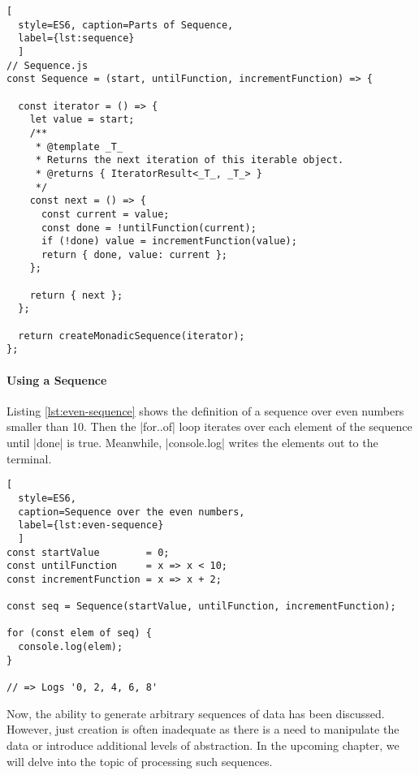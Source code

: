 \begin{lstlisting}[
  style=ES6, caption=Parts of Sequence,
  label={lst:sequence}
  ]
// Sequence.js
const Sequence = (start, untilFunction, incrementFunction) => {

  const iterator = () => {
    let value = start;
    /**
     * @template _T_
     * Returns the next iteration of this iterable object.
     * @returns { IteratorResult<_T_, _T_> }
     */
    const next = () => {
      const current = value;
      const done = !untilFunction(current);
      if (!done) value = incrementFunction(value);
      return { done, value: current };
    };

    return { next };
  };

  return createMonadicSequence(iterator);
};
\end{lstlisting}


\paragraph{Using a Sequence}
Listing \ref{lst:even-sequence} shows the definition of a sequence over even numbers smaller than 
10. Then the |for..of| loop iterates over each element of the sequence until
|done| is true. Meanwhile, |console.log| writes the elements out to the terminal.

\begin{lstlisting}[
  style=ES6, 
  caption=Sequence over the even numbers,
  label={lst:even-sequence}
  ]
const startValue        = 0;
const untilFunction     = x => x < 10;
const incrementFunction = x => x + 2;

const seq = Sequence(startValue, untilFunction, incrementFunction);

for (const elem of seq) {
  console.log(elem);
}

// => Logs '0, 2, 4, 6, 8'

\end{lstlisting}

Now, the ability to generate arbitrary sequences of data has been discussed. 
However, just creation is often inadequate as there is a need to manipulate the 
data or introduce additional levels of abstraction. In the upcoming chapter, 
we will delve into the topic of processing such sequences.
